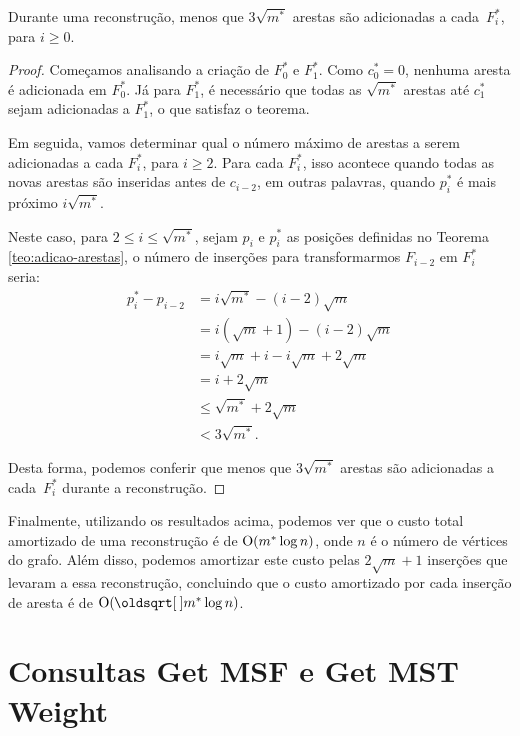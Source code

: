 \begin{theorem}
    \label{teo:deslocamento}
    Durante uma reconstrução, menos que $3 \sqrt{m^*}$ arestas são adicionadas a cada~$F_i^*$, para $i \geq 0$.
\end{theorem}
\begin{proof}
    Começamos analisando a criação de $F_0^*$ e $F_1^*$. Como $c_0^* = 0$, nenhuma aresta é adicionada em $F_0^*$. Já para $F_1^*$, é necessário que todas as $\sqrt{m^*}$ arestas até $c_1^*$ sejam adicionadas a $F_1^*$, o que satisfaz o teorema.

    Em seguida, vamos determinar qual o número máximo de arestas a serem adicionadas a cada $F_i^*$, para $i \geq 2$. Para cada $F_i^*$, isso acontece quando todas as novas arestas são inseridas antes de $c_{i-2}$, em outras palavras, quando $p_i^*$ é mais próximo $i \sqrt{m^*}$.

    Neste caso, para $2 \leq i \leq \sqrt{m^*}$, sejam $p_i$ e $p_i^*$ as posições definidas no Teorema \ref{teo:adicao-arestas}, o número de inserções para transformarmos $F_{i-2}$ em $F_i^*$ seria:
    \begin{align*}
        p_i^* - p_{i-2} & = i\sqrt{m^*} - (i-2)\sqrt{m}           \\
                        & = i(\sqrt{m}+1) - (i-2)\sqrt{m}         \\
                        & = i\sqrt{m} + i - i\sqrt{m} + 2\sqrt{m} \\
                        & = i + 2\sqrt{m}                         \\
                        & \leq \sqrt{m^*} + 2\sqrt{m}             \\
                        & < 3\sqrt{m^*}.
    \end{align*}

    Desta forma, podemos conferir que menos que $3 \sqrt{m^*}$ arestas são adicionadas a cada~$F_i^*$ durante a reconstrução.
\end{proof}

Finalmente, utilizando os resultados acima, podemos ver que o custo total amortizado de uma reconstrução é de $\mathrm{O}(m^* \log{n})$, onde $n$ é o número de vértices do grafo. Além disso, podemos amortizar este custo pelas $2\sqrt{m} + 1$ inserções que levaram a essa reconstrução, concluindo que o custo amortizado por cada inserção de aresta é de $\Oh(\sqrt{m^*} \log{n})$.

\section{Consultas Get MSF e Get MST Weight}
\label{sec:rmsf-get-msf}

